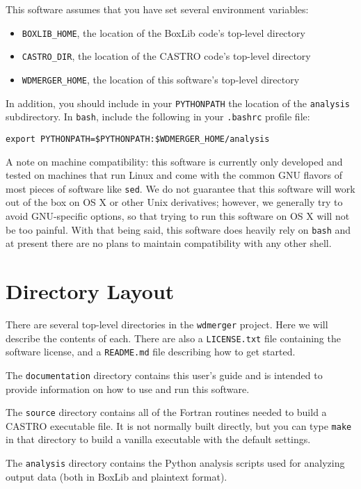 \documentclass[12pt]{book}
\begin{document}
This software assumes that you have set several environment variables:
\begin{itemize}
  \item \texttt{BOXLIB\_HOME}, the location of the BoxLib code's top-level directory
  \item \texttt{CASTRO\_DIR}, the location of the CASTRO code's top-level directory
  \item \texttt{WDMERGER\_HOME}, the location of this software's top-level directory
\end{itemize}

In addition, you should include in your \texttt{PYTHONPATH} the location of the 
\texttt{analysis} subdirectory. In \texttt{bash}, include the following in your 
\texttt{.bashrc} profile file:

\texttt{export PYTHONPATH=\$PYTHONPATH:\$WDMERGER\_HOME/analysis}

A note on machine compatibility: this software is currently only developed and tested on
machines that run Linux and come with the common GNU flavors of most pieces of software
like \texttt{sed}. We do not guarantee that this software will work out of the box on OS X
or other Unix derivatives; however, we generally try to avoid GNU-specific options, so that 
trying to run this software on OS X will not be too painful. With that being said, this 
software does heavily rely on \texttt{bash} and at present there are no plans to maintain
compatibility with any other shell.

\chapter{Directory Layout}

There are several top-level directories in the \texttt{wdmerger} project. Here we will describe
the contents of each. There are also a \texttt{LICENSE.txt} file containing the software license,
and a \texttt{README.md} file describing how to get started.

The \texttt{documentation} directory contains this user's guide and is intended to provide information
on how to use and run this software.

The \texttt{source} directory contains all of the Fortran routines needed to build a CASTRO 
executable file. It is not normally built directly, but you can type \texttt{make} in that directory
to build a vanilla executable with the default settings.

The \texttt{analysis} directory contains the Python analysis scripts used for analyzing output
data (both in BoxLib and plaintext format). 
\end{document}
